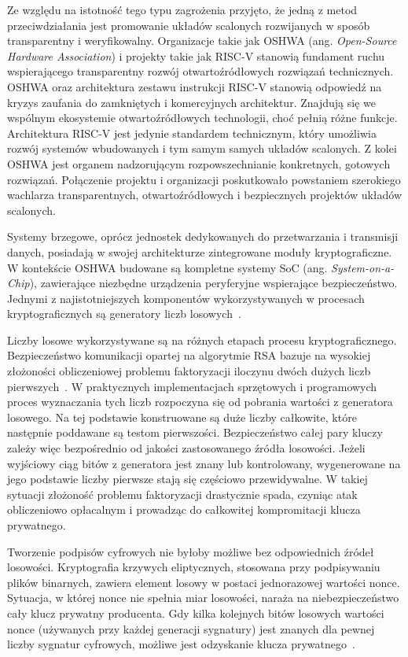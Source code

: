 Ze względu na istotność tego typu zagrożenia przyjęto, że jedną z metod 
przeciwdziałania jest promowanie układów scalonych rozwijanych w sposób 
transparentny i weryfikowalny. Organizacje takie jak OSHWA 
(ang. \textit{Open-Source Hardware Association}) i projekty takie jak RISC-V 
stanowią fundament ruchu wspierającego transparentny rozwój otwartoźródłowych 
rozwiązań technicznych. OSHWA oraz architektura zestawu instrukcji RISC-V 
stanowią odpowiedź na kryzys zaufania do zamkniętych i komercyjnych architektur. 
Znajdują się we wspólnym ekosystemie otwartoźródłowych technologii, choć 
pełnią różne funkcje. Architektura RISC-V jest jedynie standardem technicznym, 
który umożliwia rozwój systemów wbudowanych i tym samym samych układów 
scalonych. Z kolei OSHWA jest organem nadzorującym rozpowszechnianie konkretnych, 
gotowych rozwiązań. Połączenie projektu i organizacji poskutkowało powstaniem 
szerokiego wachlarza transparentnych, otwartoźródłowych i bezpiecznych projektów 
układów scalonych.

Systemy brzegowe, oprócz jednostek dedykowanych do przetwarzania i transmisji 
danych, posiadają w swojej architekturze zintegrowane moduły kryptograficzne. 
W kontekście OSHWA budowane są kompletne systemy SoC (ang. \textit{System-on-a-Chip}), 
zawierające niezbędne urządzenia peryferyjne wspierające bezpieczeństwo. 
Jednymi z najistotniejszych komponentów wykorzystywanych w procesach 
kryptograficznych są generatory liczb losowych~\cite{2016Sreekumar-Ramesh}.

Liczby losowe wykorzystywane są na różnych etapach procesu kryptograficznego. 
Bezpieczeństwo komunikacji opartej na algorytmie RSA bazuje na wysokiej złożoności 
obliczeniowej problemu faktoryzacji iloczynu dwóch dużych liczb 
pierwszych~\cite{Handbook-of-Applied-Cryptography}. W praktycznych 
implementacjach sprzętowych i programowych proces wyznaczania tych liczb 
rozpoczyna się od pobrania wartości z generatora losowego. Na tej podstawie 
konstruowane są duże liczby całkowite, które następnie poddawane są testom 
pierwszości. Bezpieczeństwo całej pary kluczy zależy więc bezpośrednio od 
jakości zastosowanego źródła losowości. Jeżeli wyjściowy ciąg bitów z generatora 
jest znany lub kontrolowany, wygenerowane na jego podstawie liczby pierwsze 
stają się częściowo przewidywalne. W takiej sytuacji złożoność problemu 
faktoryzacji drastycznie spada, czyniąc atak obliczeniowo opłacalnym i prowadząc 
do całkowitej kompromitacji klucza prywatnego.

Tworzenie podpisów cyfrowych nie byłoby możliwe bez odpowiednich źródeł 
losowości. Kryptografia krzywych eliptycznych, stosowana przy podpisywaniu 
plików binarnych, zawiera element losowy w postaci jednorazowej wartości 
nonce. Sytuacja, w której nonce nie spełnia miar losowości, naraża na 
niebezpieczeństwo cały klucz prywatny producenta. Gdy kilka kolejnych bitów 
losowych wartości nonce (używanych przy każdej generacji sygnatury) jest 
znanych dla pewnej liczby sygnatur cyfrowych, możliwe jest odzyskanie klucza 
prywatnego~\cite{ch1-the-insecurity-of-ECDSA}.

